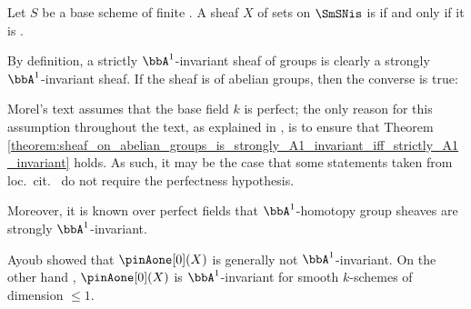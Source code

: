 \begin{lemma}
    Let $S$ be a  base scheme of finite . A sheaf $X$ of sets on $\SmSNis$ is  if and only if it is   .
\end{lemma}

By definition, a strictly $\bbA^1$-invariant sheaf of groups is clearly a strongly $\bbA^1$-invariant sheaf. If the sheaf is of abelian groups, then the converse is true:



\begin{remark}
    Morel's text \cite{morel_a1at} assumes that the base field $k$ is perfect; the only reason for this assumption throughout the text, as explained in \cite[Remark 1.17]{morel_a1at}, is to ensure that Theorem \ref{theorem:sheaf_on_abelian_groups_is_strongly_A1_invariant_iff_strictly_A1_invariant} holds. As such, it may be the case that some statements taken from loc.~cit.~ do not require the perfectness hypothesis.
\end{remark}

Moreover, it is known over perfect fields that $\bbA^1$-homotopy group sheaves are strongly $\bbA^1$-invariant.



\begin{remark}
    Ayoub showed that \cite{ayoub_cmcpiA1} $\pinAone[0](X)$ is generally not $\bbA^1$-invariant. On the other hand \cite[Remark 1.13]{morel_a1at}, $\pinAone[0](X)$ is $\bbA^1$-invariant for smooth $k$-schemes of dimension $\leq 1$.
\end{remark}

